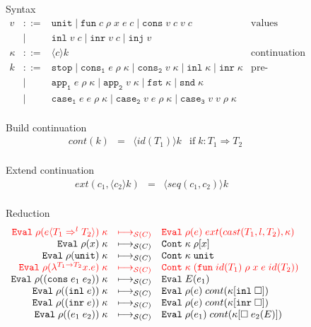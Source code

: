 \documentclass[acmsmall,review,anonymous]{acmart}\settopmatter{printfolios=true,printccs=false,printacmref=false}
\newcommand{\stxrule}[3]{#1 & ::= & #3 & \text{#2}\\}
\newcommand{\stxrulecont}[1]{& | & #1 & \\}
\newcommand{\funrule}[3]{#1 &=& #2 & #3\\}
\newcommand{\sOOinspect}[3]{\mathtt{Eval} \; #2(#1) \; #3}
\newcommand{\sOOreturn}[2]{\mathtt{Cont} \; #2 \; #1}
\newcommand{\sOOhalt}[1]{\mathtt{Halt} \; #1}
\newcommand{\eOOvar}[1]{#1}
\newcommand{\eOOsole}[0]{\mathtt{unit}}
\newcommand{\eOOlam}[4]{\lambda^{#1\rightarrow{}#2}#3.#4}
\newcommand{\eOOapp}[2]{#1 \; #2}
\newcommand{\eOOcons}[2]{\mathtt{cons} \; #1 \; #2}
\newcommand{\eOOinl}[1]{\mathtt{inl} \; #1}
\newcommand{\eOOinr}[1]{\mathtt{inr} \; #1}
\newcommand{\eOOcast}[4]{#1 \langle \cOOcast{#2}{#3}{#4} \rangle}
\newcommand{\cOOcast}[3]{#1 \Rightarrow^{#2} #3}
\newcommand{\rOOsucc}[1]{\mathtt{succ}\;#1}
\newcommand{\rOOfail}[1]{\mathtt{fail}\;#1}
\newcommand{\kOOinl}[1]{#1[\mathtt{inl} \; \square]}
\newcommand{\kOOinr}[1]{#1[\mathtt{inr} \; \square]}
\newcommand{\kOOappI}[3]{
	#3[\square \; #2(#1) ]
}
\newcommand{\hcvOOinj}[2]{\mathtt{inj} \; #2}
\newcommand{\hcvOOfun}[5]{\mathtt{fun} \; #1 \; #2 \; #3 \; #4 \; #5}
\newcommand{\hcvOOtt}[0]{\mathtt{unit}}
\newcommand{\hcvOOcons}[4]{\mathtt{cons}\;#1\;#2\;#3\;#4}
\newcommand{\hcvOOinl}[2]{\mathtt{inl}\;#1\;#2}
\newcommand{\hcvOOinr}[2]{\mathtt{inr}\;#1\;#2}
\newcommand{\hckOOmt}[0]{\mathtt{stop}}
\newcommand{\sidecond}[1]{\text{if}\;#1}
\newcommand{\judgeSreduce}[3]{#2 \longmapsto_{\mathcal{S}(#1)} #3}
\newcommand{\redruleS}[3]{#1 & \longmapsto_{\mathcal{S}(C)} & #2 & #3\\}
\newcommand{\hiredruleS}[3]{\highlight{#1} & 
\highlight{\longmapsto_{\mathcal{S}(C)}} & \highlight{#2} & \highlight{#3} \\}
\newcommand{\highlight}[1]{{\color{red} #1}}
\begin{document}
\begin{figure}
	Syntax
	\[
	\begin{array}{rclr}
	
	\stxrule{v}{values}{
		\hcvOOtt \mid
		\hcvOOfun{c}{\rho}{x}{e}{c} \mid
		\hcvOOcons{v}{c}{v}{c}
	}
	\stxrulecont{
		\hcvOOinl{v}{c} \mid
		\hcvOOinr{v}{c} \mid
		\hcvOOinj{P}{v}
	}
	\stxrule{\kappa}{continuation}{
		\langle c \rangle k
	}
	\stxrule{k}{pre-continuations}{
		\hckOOmt \mid{}
		\mathtt{cons_1} \; e \; \rho \; \kappa \mid{}
		\mathtt{cons_2} \; v \; \kappa \mid{}
		\mathtt{inl} \; \kappa \mid{}
		\mathtt{inr} \; \kappa
	}
	\stxrulecont{
		\mathtt{app_1} \; e \; \rho \; \kappa \mid{}
		\mathtt{app_2} \; v \; \kappa \mid{}
		\mathtt{fst} \; \kappa \mid{}
		\mathtt{snd} \; \kappa
	}
	\stxrulecont{
		\mathtt{case_1} \; e \; e \; \rho \; \kappa \mid
		\mathtt{case_2} \; v \; e \; \rho \; \kappa \mid{}
		\mathtt{case_3} \; v \; v \; \rho \; \kappa
	}
	\end{array}
	\]
	
	Build continuation 
	\[
	\begin{array}{rclc}
	\funrule{cont(k)}{\langle id(T_1) \rangle k}{
		\sidecond{k : T_1 \Longrightarrow T_2}}
	\end{array}
	\]
	
	Extend continuation 
	\[
	\begin{array}{rclc}
	\funrule{ext(c_1,\langle c_2 \rangle k)}{\langle seq(c_1,c_2) \rangle k}{}
	\end{array}
	\]
	
	Reduction \fbox{$ \judgeSreduce{C}{s}{s} $}
	\[
	\begin{array}{rclr}
	\hiredruleS{
		\sOOinspect{\eOOcast{e}{T_1}{l}{T_2}}{\rho}{\kappa}
	}{
		\sOOinspect{e}{\rho}{ext(cast(T_1,l,T_2),\kappa)}
	}{}
	\redruleS{
		\sOOinspect{\eOOvar{x}}{\rho}{\kappa}
	}{	
		\sOOreturn{\rho[x]}{\kappa}
	}{}
	\redruleS{
		\sOOinspect{\eOOsole}{\rho}{\kappa}
	}{
		\sOOreturn{\hcvOOtt}{\kappa}
	}{}
	\hiredruleS{
		\sOOinspect{\eOOlam{T_1}{T_2}{x}{e}}{\rho}{\kappa}
	}{
		\sOOreturn{(\hcvOOfun{id(T_1)}{\rho}{x}{e}{id(T_2)})}{\kappa}
	}{}
	\redruleS{
		\sOOinspect{(\eOOcons{e_1}{e_2})}{\rho}{\kappa}
	}{
		\sOOinspect{e_1}{E}{}
	}{}
	\redruleS{
		\sOOinspect{(\eOOinl{e})}{\rho}{\kappa}
	}{
		\sOOinspect{e}{\rho}{cont(\kOOinl{\kappa})}
	}{}
	\redruleS{
		\sOOinspect{(\eOOinr{e})}{\rho}{\kappa}
	}{
		\sOOinspect{e}{\rho}{cont(\kOOinr{\kappa})}
	}{}
	\redruleS{
		\sOOinspect{(\eOOapp{e_1}{e_2})}{\rho}{\kappa}
	}{
		\sOOinspect{e_1}{\rho}{cont(\kOOappI{E}{e_2}{\kappa})}}{}
	

\end{array}\]
\end{figure}
\end{document}
